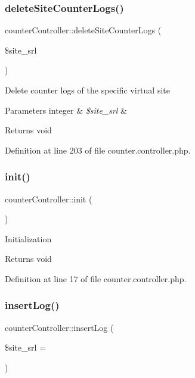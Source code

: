 \subsubsection{\texorpdfstring{delete\+Site\+Counter\+Logs()}{deleteSiteCounterLogs()}}
{\footnotesize\ttfamily counter\+Controller\+::delete\+Site\+Counter\+Logs (\begin{DoxyParamCaption}\item[{}]{\$site\+\_\+srl }\end{DoxyParamCaption})}

Delete counter logs of the specific virtual site


\begin{DoxyParams}[1]{Parameters}
integer & {\em \$site\+\_\+srl} & \\
\hline
\end{DoxyParams}
\begin{DoxyReturn}{Returns}
void 
\end{DoxyReturn}


Definition at line 203 of file counter.\+controller.\+php.

\mbox{\label{classcounterController_a38b5221a33984da33543a4b48ea739dd}} 
\subsubsection{\texorpdfstring{init()}{init()}}
{\footnotesize\ttfamily counter\+Controller\+::init (\begin{DoxyParamCaption}{ }\end{DoxyParamCaption})}

Initialization

\begin{DoxyReturn}{Returns}
void 
\end{DoxyReturn}


Definition at line 17 of file counter.\+controller.\+php.

\mbox{\label{classcounterController_a047bffeaae0a0e5ebe6b50225db29ef9}} 
\subsubsection{\texorpdfstring{insert\+Log()}{insertLog()}}
{\footnotesize\ttfamily counter\+Controller\+::insert\+Log (\begin{DoxyParamCaption}\item[{}]{\$site\+\_\+srl = {} }\end{DoxyParamCaption})}

